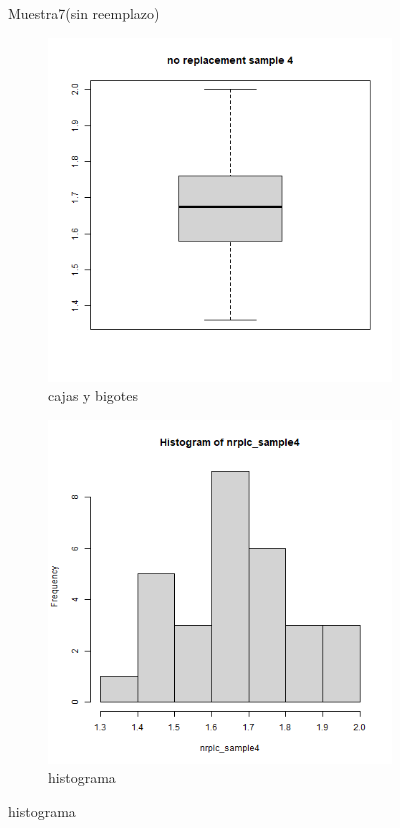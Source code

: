 \documentclass[a4paper,12pt]{article}
\begin{document}
\begin{enumerate}
\begin{figure}[t!]
    
    \caption{Muestra7(sin reemplazo)}
    \label{figure}
\end{figure}

\begin{figure}[t!]
    \centering
    \begin{subfigure}[b]{0.4\linewidth}             
        \includegraphics[width = \linewidth]{./datos generados (Ejercicio 1)/no_replacement_sample4_boxplot.png}
        \caption{cajas y bigotes}
    \end{subfigure}
    \begin{subfigure}[b]{0.4\linewidth}               
        \includegraphics[width = \linewidth]{./datos generados (Ejercicio 1)/no_replacement_sample4_hist.png}
        \caption{histograma}
    \end{subfigure}


\end{figure}
\end{enumerate}
\end{document}
